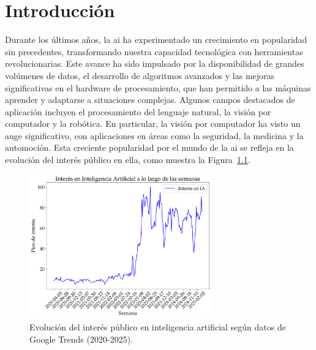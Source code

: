 \documentclass[11pt,spanish,listoffigures,listoftables]{tfgetsinf}
\begin{document}

\mainmatter


\chapter{Introducci\'on}\label{chap:introduccion}
Durante los últimos años, la \gls{ai} ha experimentado un crecimiento en popularidad sin precedentes, transformando nuestra capacidad tecnológica con herramientas revolucionarias. Este avance ha sido impulsado por la disponibilidad de grandes volúmenes de datos, el desarrollo de algoritmos avanzados y las mejoras significativas en el hardware de procesamiento, que han permitido a las máquinas aprender y adaptarse a situaciones complejas. Algunos campos destacados de aplicación incluyen el procesamiento del lenguaje natural, la visión por computador y la robótica. En particular, la visión por computador ha visto un auge significativo, con aplicaciones en áreas como la seguridad, la medicina y la automoción. Esta creciente popularidad por el mundo de la \gls{ai} se refleja en la evolución del interés público en ella, como muestra la Figura~\ref{fig:interes_en_inteligencia_artificial}.

\begin{figure}[H]
   \centering
   \includegraphics[width=0.7\textwidth]{excels/introduccion/interes_en_ia.pdf}
   \caption[Evolución del interés público en inteligencia artificial según datos de Google Trends (2020-2025)]{Evolución del interés público en inteligencia artificial según datos de Google Trends (2020-2025).}
\label{fig:interes_en_inteligencia_artificial}
\end{figure}
\end{document}
